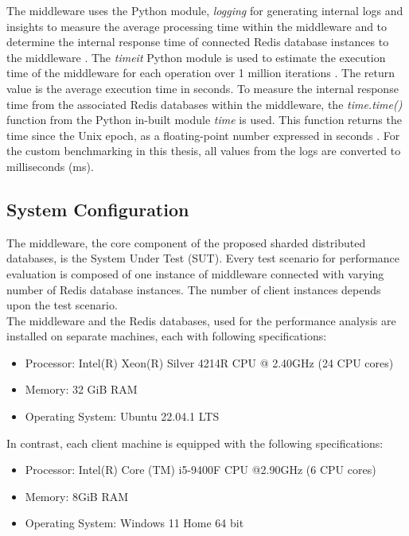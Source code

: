\noindent The middleware uses the Python module, \emph{logging} for generating internal logs and insights to measure the average processing time within the middleware and to determine the internal response time of connected Redis database instances to the middleware \cite{logging}. The \emph{timeit} Python module is used to estimate the execution time of the middleware for each operation over 1 million iterations \cite{timeit}. The return value is the average execution time in seconds. To measure the internal response time from the associated Redis databases within the middleware, the \emph{time.time()} function from the Python in-built module \emph{time} is used. This function returns the time since the Unix epoch, as a floating-point number expressed in seconds \cite{time}. For the custom benchmarking in this thesis, all values from the logs are converted to milliseconds (ms).


\subsection{System Configuration}
\label{config}
The middleware, the core component of the proposed sharded distributed databases, is the System Under Test (SUT). Every test scenario for performance evaluation is composed of one instance of middleware connected with varying number of Redis database instances. The number of client instances depends upon the test scenario. \\

\noindent The middleware and the Redis databases, used for the performance analysis are installed on separate machines, each with following specifications:
\begin{itemize}
\item[-] Processor: Intel(R) Xeon(R) Silver 4214R CPU @ 2.40GHz (24 CPU cores)
\item[-]  Memory: 32 GiB RAM
\item[-]  Operating System: Ubuntu 22.04.1 LTS
\end{itemize}
In contrast, each client machine is equipped with the following specifications:
\begin{itemize}
\item[-]  Processor: Intel(R) Core (TM) i5-9400F CPU @2.90GHz (6 CPU cores)
\item[-]  Memory: 8GiB RAM
\item[-]  Operating System: Windows 11 Home 64 bit
\end{itemize}

